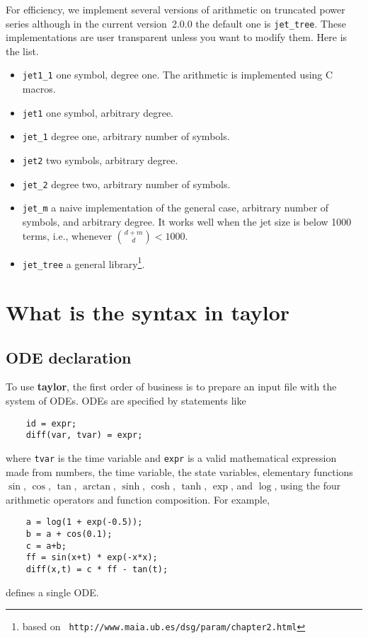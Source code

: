 \documentclass[10pt]{article}
\theoremstyle{remark}
\newcommand{\taylorname}{{\bf taylor}}
\newcommand{\version}{2.0.0}
\begin{document}
For efficiency, we implement several versions of arithmetic on
truncated power series although in the current version~\version{} the
default one is \verb+jet_tree+. These implementations are user
transparent unless you want to modify them. Here is the list.
\begin{itemize}
    \item \verb+jet1_1+ one symbol, degree one. The arithmetic is
      implemented using C macros.
    \item \verb+jet1+ one symbol, arbitrary degree. 
    \item \verb+jet_1+ degree one, arbitrary number of symbols.
    \item \verb+jet2+ two symbols, arbitrary degree.
    \item \verb+jet_2+ degree two, arbitrary number of symbols.
    \item \verb+jet_m+ a naive implementation of the general case,
      arbitrary number of symbols, and arbitrary degree. It works well
      when the jet size is below 1000 terms, i.e., whenever ${{d+m}
        \choose {d}} < 1000$.
    \item \verb+jet_tree+ a general library\footnote{based on {\tt
      http://www.maia.ub.es/dsg/param/chapter2.html}}.
\end{itemize}


\section{What is the syntax in \taylorname{}} \label{sec:syntax}

\subsection*{ODE declaration}
To use \taylorname{}, the first order of business is to prepare an
input file with the system of ODEs.  ODEs are specified by statements
like
\begin{verbatim}
    id = expr;
    diff(var, tvar) = expr;
\end{verbatim}
where {\tt tvar} is the time variable and {\tt expr} is a valid
mathematical expression made from numbers, the time variable, the
state variables, elementary functions $\sin$, $\cos$, $\tan$,
$\arctan$, $\sinh$, $\cosh$, $\tanh$, $\exp$, and $\log$, using the
four arithmetic operators and function composition. For example,
\begin{verbatim}
    a = log(1 + exp(-0.5));
    b = a + cos(0.1);
    c = a+b;
    ff = sin(x+t) * exp(-x*x);
    diff(x,t) = c * ff - tan(t);
\end{verbatim}
defines a single ODE.
\end{document}
